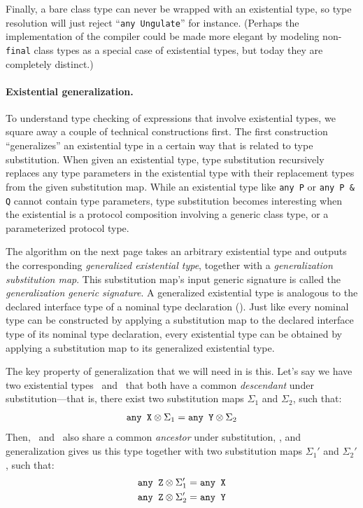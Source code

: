 \documentclass[../generics]{subfiles}
\begin{document}
Finally, a bare class type can never be wrapped with an existential type, so type resolution will just reject ``\texttt{any~Ungulate}'' for instance. (Perhaps the implementation of the compiler could be made more elegant by modeling non-\texttt{final} class types as a special case of existential types, but today they are completely distinct.)

\paragraph{Existential generalization.}
To understand type checking of expressions that involve existential types, we square away a couple of technical constructions first. The first construction ``generalizes'' an existential type in a certain way that is related to type substitution. When given an existential type, type substitution recursively replaces any type parameters in the existential type with their replacement types from the given substitution map. While an existential type like \texttt{any~P} or \texttt{any P \& Q} cannot contain type parameters, type substitution becomes interesting when the existential is a protocol composition involving a generic class type, or a parameterized protocol type.

The algorithm on the next page takes an arbitrary existential type and outputs the corresponding \emph{generalized existential type}, together with a \emph{generalization substitution map}. This substitution map's input generic signature is called the \emph{generalization generic signature}. A generalized existential type is analogous to the declared interface type of a nominal type declaration (). Just like every nominal type can be constructed by applying a substitution map to the declared interface type of its nominal type declaration, every existential type can be obtained by applying a substitution map to its generalized existential type.

The key property of generalization that we will need in  is this. Let's say we have two existential types \AnyX\ and \AnyY\ that both have a common \emph{descendant} under substitution---that is, there exist two substitution maps $\Sigma_1$ and $\Sigma_2$, such that:
\[
\texttt{any~X} \otimes \Sigma_1 = \texttt{any~Y} \otimes \Sigma_2
\]
Then, \AnyX\ and \AnyY\ also share a common \emph{ancestor} under substitution, \AnyZ, and generalization gives us this type together with two substitution maps $\Sigma_1'$ and $\Sigma_2'$, such that:
\begin{gather*}
\texttt{any~Z} \otimes \Sigma_1' = \texttt{any~X} \\
\texttt{any~Z} \otimes \Sigma_2' = \texttt{any~Y}
\end{gather*}
\end{document}
